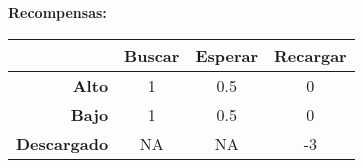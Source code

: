     \textbf{Recompensas:}\\
    \begin{table}[H]
    \centering
    \begin{tabular}{| r | c|c|c |}
    \hline
     & \textbf{Buscar} & \textbf{Esperar} & \textbf{Recargar}\\
    \hline
    \textbf{Alto} & 1 & 0.5 & 0 \\
    \hline
    \textbf{Bajo} & 1 & 0.5 & 0 \\
    \hline
    \textbf{Descargado} & NA & NA & -3 \\
    \hline
    \end{tabular}
    \end{table}
